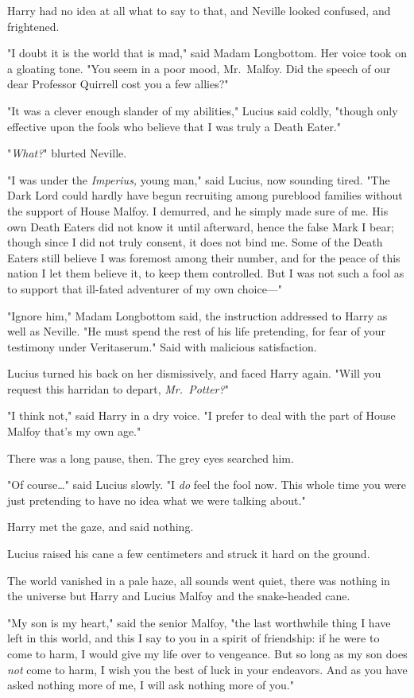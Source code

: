 Harry had no idea at all what to say to that, and Neville looked confused, and
frightened.

"I doubt it is the world that is mad," said Madam Longbottom. Her voice took on
a gloating tone. "You seem in a poor mood, Mr.~Malfoy. Did the speech of our
dear Professor Quirrell cost you a few allies?"

"It was a clever enough slander of my abilities," Lucius said coldly, "though
only effective upon the fools who believe that I was truly a Death Eater."

"\emph{What?}" blurted Neville.

"I was under the \emph{Imperius,} young man," said Lucius, now sounding tired.
"The Dark Lord could hardly have begun recruiting among pureblood families
without the support of House Malfoy. I demurred, and he simply made sure of me.
His own Death Eaters did not know it until afterward, hence the false Mark I
bear; though since I did not truly consent, it does not bind me. Some of the
Death Eaters still believe I was foremost among their number, and for the peace
of this nation I let them believe it, to keep them controlled. But I was not
such a fool as to support that ill-fated adventurer of my own choice---"

"Ignore him," Madam Longbottom said, the instruction addressed to Harry as well
as Neville. "He must spend the rest of his life pretending, for fear of your
testimony under Veritaserum." Said with malicious satisfaction.

Lucius turned his back on her dismissively, and faced Harry again. "Will you
request this harridan to depart, \emph{Mr.~Potter?}"

"I think not," said Harry in a dry voice. "I prefer to deal with the part of
House Malfoy that's my own age."

There was a long pause, then. The grey eyes searched him.

"Of course{\ldots}" said Lucius slowly. "I \emph{do} feel the fool now. This
whole time you were just pretending to have no idea what we were talking about."

Harry met the gaze, and said nothing.

Lucius raised his cane a few centimeters and struck it hard on the ground.

The world vanished in a pale haze, all sounds went quiet, there was nothing in
the universe but Harry and Lucius Malfoy and the snake-headed cane.

"My son is my heart," said the senior Malfoy, "the last worthwhile thing I have
left in this world, and this I say to you in a spirit of friendship: if he were
to come to harm, I would give my life over to vengeance. But so long as my son
does \emph{not} come to harm, I wish you the best of luck in your endeavors.
And as you have asked nothing more of me, I will ask nothing more of you."

